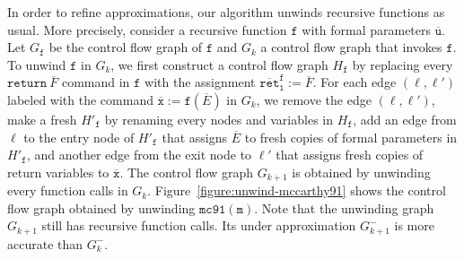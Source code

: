 In order to refine approximations, our algorithm unwinds recursive
functions as usual. More precisely, consider a recursive function
$\mathtt{f}$ with formal parameters $\overline{\mathtt{u}}$. Let
$G_{\mathtt{f}}$ be  
the control flow graph of $\mathtt{f}$ and $G_k$ a control flow graph
that invokes $\mathtt{f}$. To unwind $\mathtt{f}$ in $G_k$, 
we first construct a control flow graph $H_{\mathtt{f}}$ by 
replacing every $\mathtt{return}\ \overline{F}$ command in
$\mathtt{f}$ with the assignment $\mathtt{\overline{ret}^f_1} :=
\overline{F}$. For each edge $(\ell,  
\ell')$ labeled with the command $\overline{\mathtt{x}} :=
\mathtt{f}(\overline{E})$ in $G_k$, we remove 
the edge $(\ell, \ell')$, make a fresh $H'_{\mathtt{f}}$ by
renaming every nodes and variables in $H_{\mathtt{f}}$, add an edge
from $\ell$ to the entry node of $H'_{\mathtt{f}}$ that assigns
$\overline{E}$ to fresh copies of formal parameters in 
$H'_{\mathtt{f}}$, and another edge from the exit node to $\ell'$ that
assigns fresh copies of return variables to
$\overline{\mathtt{x}}$. The control flow graph $G_{k+1}$ 
is obtained by unwinding every function calls in $G_k$. 
Figure~\ref{figure:unwind-mccarthy91} shows the control flow graph
obtained by unwinding $\mathtt{mc91(m)}$. Note that the
unwinding graph $G_{k+1}$ still has recursive function calls. Its
under approximation $G^-_{k+1}$ is more accurate than $G^-_k$.


